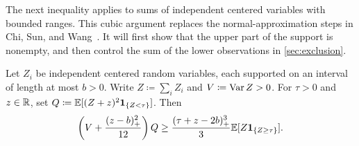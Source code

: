 The next inequality applies to sums of independent centered variables with bounded ranges. This cubic argument replaces the normal-approximation steps in Chi, Sun, and Wang~\cite[Sections 5--6]{CSW2026}.
It will first show that the upper part of the support is nonempty, and then control the sum of the lower observations in \cref{sec:exclusion}.

\begin{lemma}\label{lem:cubic}
Let $Z_i$ be independent centered random variables, each supported on an interval of length at most $b>0$.
Write $Z\coloneqq\sum_iZ_i$ and $V\coloneqq\operatorname{Var} Z>0$.
For $\tau>0$ and $z\in\mathbb R$, set $Q\coloneqq\mathbb E[(Z+z)^2\mathbf 1_{\{Z<\tau\}}]$.
Then
\begin{align}
 \left(V+\frac{(z-b)_+^2}{12}\right)Q
 \ge\frac{(\tau+z-2b)_+^3}{3}\mathbb E[Z\mathbf 1_{\{Z\ge\tau\}}].
 \label{eq:cubic-test}
\end{align}
\end{lemma}

